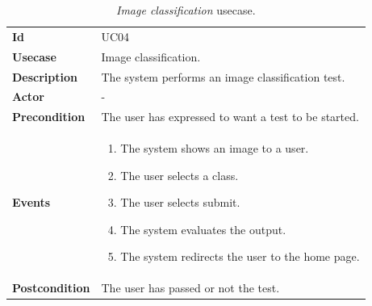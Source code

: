 \begin{table}[h!t]
    \centering
    \caption{\emph{Image classification} usecase.}
    \label{tab:uc:image}
    \centering
    \begin{tabular}{l | p{80mm}}
        \textbf{Id}            & UC04                                                 \\
        \textbf{Usecase}       & Image classification.                                \\
        \textbf{Description}   & The system performs an image classification test.    \\
        \textbf{Actor}         & -                                                    \\
        \textbf{Precondition}  & The user has expressed to want a test to be started. \\
        \textbf{Events}        & \begin{enumerate}
            \item The system shows an image to a user.
            \item The user selects a class.
            \item The user selects submit.
            \item The system evaluates the output.
            \item The system redirects the user to the home page.
        \end{enumerate}                           \\
        \textbf{Postcondition} & The user has passed or not the test.
    \end{tabular}
\end{table}

